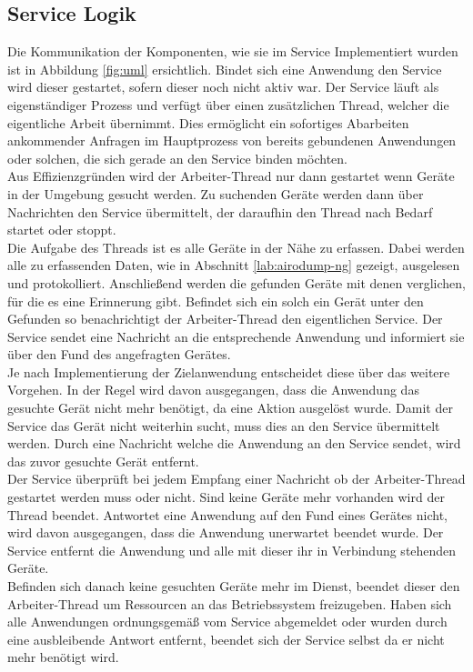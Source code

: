 \documentclass[]{report}
\begin{document}
\subsection{Service Logik}
Die Kommunikation der Komponenten, wie sie im Service Implementiert wurden ist in Abbildung \ref{fig:uml} ersichtlich. Bindet sich eine Anwendung den Service wird dieser gestartet, sofern dieser noch nicht aktiv war. Der Service läuft als eigenständiger Prozess und verfügt über einen zusätzlichen Thread, welcher die eigentliche Arbeit übernimmt. Dies ermöglicht ein sofortiges Abarbeiten ankommender Anfragen im Hauptprozess von bereits gebundenen Anwendungen oder solchen, die sich gerade an den Service binden möchten. \\
Aus Effizienzgründen wird der Arbeiter-Thread nur dann gestartet wenn Geräte in der Umgebung gesucht werden. Zu suchenden Geräte werden dann über Nachrichten den Service übermittelt, der daraufhin den Thread nach Bedarf startet oder stoppt. \\
Die Aufgabe des Threads ist es alle Geräte in der Nähe zu erfassen. Dabei werden alle zu erfassenden Daten, wie in Abschnitt \ref{lab:airodump-ng} gezeigt, ausgelesen und protokolliert. Anschließend werden die gefunden Geräte mit denen verglichen, für die es eine Erinnerung gibt. Befindet sich ein solch ein Gerät unter den Gefunden so benachrichtigt der Arbeiter-Thread den eigentlichen Service. Der Service sendet eine Nachricht an die entsprechende Anwendung und informiert sie über den Fund des angefragten Gerätes. \\ 
Je nach Implementierung der Zielanwendung entscheidet diese über das weitere Vorgehen. In der Regel wird davon ausgegangen, dass die Anwendung das gesuchte Gerät nicht mehr benötigt, da eine Aktion ausgelöst wurde. Damit der Service das Gerät nicht weiterhin sucht, muss dies an den Service übermittelt werden.  
Durch eine Nachricht welche die Anwendung an den Service sendet, wird das zuvor gesuchte Gerät entfernt.\\
Der Service überprüft bei jedem Empfang einer Nachricht ob der Arbeiter-Thread gestartet werden muss oder nicht. Sind keine Geräte mehr vorhanden wird der Thread beendet. Antwortet eine Anwendung auf den Fund eines Gerätes nicht, wird davon ausgegangen, dass die Anwendung unerwartet beendet wurde. Der Service entfernt die Anwendung und alle mit dieser ihr in Verbindung stehenden Geräte.\\
Befinden sich danach keine gesuchten Geräte mehr im Dienst, beendet dieser den Arbeiter-Thread um Ressourcen an das Betriebssystem freizugeben. Haben sich alle Anwendungen ordnungsgemäß vom Service abgemeldet oder wurden durch eine ausbleibende Antwort entfernt, beendet sich der Service selbst da er nicht mehr benötigt wird.
\end{document}
